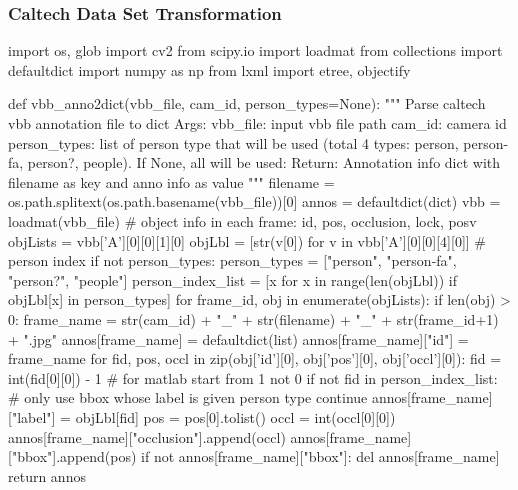 \subsubsection{Caltech Data Set Transformation}\label{appendix:caltech_transform}
\begin{pythoncode}
import os, glob
import cv2
from scipy.io import loadmat
from collections import defaultdict
import numpy as np
from lxml import etree, objectify

def vbb_anno2dict(vbb_file, cam_id, person_types=None):
    """
    Parse caltech vbb annotation file to dict
    Args:
        vbb_file: input vbb file path
        cam_id: camera id
        person_types: list of person type that will be used (total 4 types: person, person-fa, person?, people).
            If None, all will be used:
    Return:
        Annotation info dict with filename as key and anno info as value
    """
    filename = os.path.splitext(os.path.basename(vbb_file))[0]
    annos = defaultdict(dict)
    vbb = loadmat(vbb_file)
    # object info in each frame: id, pos, occlusion, lock, posv
    objLists = vbb['A'][0][0][1][0]
    objLbl = [str(v[0]) for v in vbb['A'][0][0][4][0]]
    # person index
    if not person_types:
        person_types = ["person", "person-fa", "person?", "people"]
    person_index_list = [x for x in range(len(objLbl)) if objLbl[x] in person_types]
    for frame_id, obj in enumerate(objLists):
        if len(obj) > 0:
            frame_name = str(cam_id) + "_" + str(filename) + "_" + str(frame_id+1) + ".jpg"
            annos[frame_name] = defaultdict(list)
            annos[frame_name]["id"] = frame_name
            for fid, pos, occl in zip(obj['id'][0], obj['pos'][0], obj['occl'][0]):
                fid = int(fid[0][0]) - 1  # for matlab start from 1 not 0
                if not fid in person_index_list:  # only use bbox whose label is given person type
                    continue
                annos[frame_name]["label"] = objLbl[fid]
                pos = pos[0].tolist()
                occl = int(occl[0][0])
                annos[frame_name]["occlusion"].append(occl)
                annos[frame_name]["bbox"].append(pos)
            if not annos[frame_name]["bbox"]:
                del annos[frame_name]
    return annos



\end{pythoncode}
